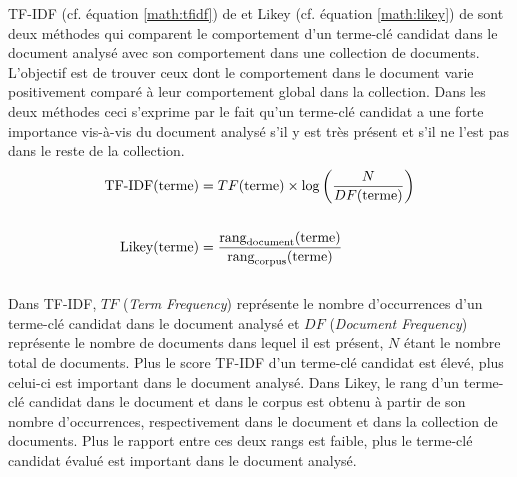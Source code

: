           TF-IDF (cf. équation \ref{math:tfidf}) de  et
          Likey (cf. équation \ref{math:likey}) de 
          sont deux méthodes qui comparent le comportement d'un terme-clé
          candidat dans le document analysé avec son comportement dans une
          collection de documents. L'objectif est de trouver ceux dont le
          comportement dans le document varie positivement comparé à leur
          comportement global dans la collection. Dans les deux méthodes ceci
          s'exprime par le fait qu'un terme-clé candidat a une forte importance
          vis-à-vis du document analysé s'il y est très présent et s'il ne l'est
          pas dans le reste de la collection.
          \begin{align}
            \text{TF-IDF}(\text{terme}) &= TF(\text{terme}) \times \log\left(\frac{N}{DF(\text{terme})}\right) \label{math:tfidf}\\
            \notag\\
            \text{Likey}(\text{terme}) &= \frac{\text{rang}_{\text{document}}(\text{terme})}{\text{rang}_{\text{corpus}}(\text{terme})} \label{math:likey}
          \end{align}\\
          Dans TF-IDF, $TF$ (\textit{Term Frequency}) représente le nombre
          d'occurrences d'un terme-clé candidat dans le document analysé et $DF$
          (\textit{Document Frequency}) représente le nombre de documents dans
          lequel il est présent, $N$ étant le nombre total de documents. Plus le
          score TF-IDF d'un terme-clé candidat est élevé, plus celui-ci est
          important dans le document analysé. Dans Likey, le rang d'un terme-clé
          candidat dans le document et dans le corpus est obtenu à partir de son
          nombre d'occurrences, respectivement dans le document et dans la
          collection de documents. Plus le rapport entre ces deux rangs est
          faible, plus le terme-clé candidat évalué est important dans le
          document analysé.

